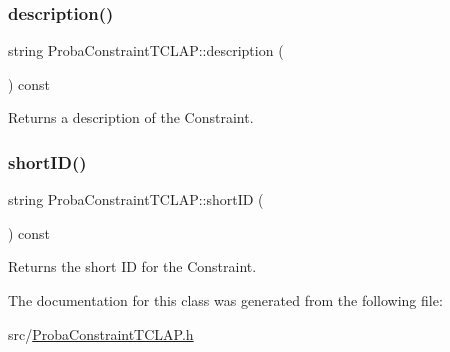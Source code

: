\subsubsection{\texorpdfstring{description()}{description()}}
{\footnotesize\ttfamily string Proba\+Constraint\+T\+C\+L\+A\+P\+::description (\begin{DoxyParamCaption}{ }\end{DoxyParamCaption}) const\hspace{0.3cm}{\ttfamily [virtual]}}

Returns a description of the Constraint. \hypertarget{class_proba_constraint_t_c_l_a_p_aa90cac7ed5ed370fd516b3bf31f2de7d}{}\label{class_proba_constraint_t_c_l_a_p_aa90cac7ed5ed370fd516b3bf31f2de7d} 
\subsubsection{\texorpdfstring{short\+I\+D()}{shortID()}}
{\footnotesize\ttfamily string Proba\+Constraint\+T\+C\+L\+A\+P\+::short\+ID (\begin{DoxyParamCaption}{ }\end{DoxyParamCaption}) const\hspace{0.3cm}{\ttfamily [virtual]}}

Returns the short ID for the Constraint. 

The documentation for this class was generated from the following file\+:\begin{DoxyCompactItemize}
\item 
src/\hyperlink{_proba_constraint_t_c_l_a_p_8h}{Proba\+Constraint\+T\+C\+L\+A\+P.\+h}\end{DoxyCompactItemize}
